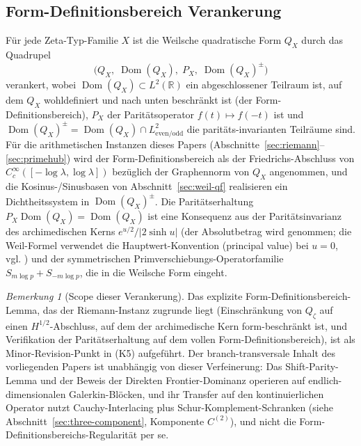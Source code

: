 \documentclass[11pt]{article}
\theoremstyle{definition}
\theoremstyle{remark}
\newtheorem{remark}[theorem]{Bemerkung}
\begin{document}
\subsection{Form-Definitionsbereich Verankerung}
\label{sec:weil-form-domain}

Für jede Zeta-Typ-Familie $X$ ist die Weilsche quadratische Form $Q_X$
durch das Quadrupel
\begin{equation}\label{eq:weil-quadruple}
  \bigl(Q_X,\; \operatorname{Dom}(Q_X),\; P_X,\;
        \operatorname{Dom}(Q_X)^{\pm}\bigr)
\end{equation}
verankert, wobei $\operatorname{Dom}(Q_X) \subset L^2(\mathbb{R})$ ein
abgeschlossener Teilraum ist, auf dem $Q_X$ wohldefiniert und nach unten beschränkt ist
(der Form-Definitionsbereich), $P_X$ der Paritätsoperator $f(t) \mapsto f(-t)$ ist und
$\operatorname{Dom}(Q_X)^{\pm} = \operatorname{Dom}(Q_X) \cap L^2_{\mathrm{even/odd}}$
die paritäts-invarianten Teilräume sind. Für die arithmetischen Instanzen
dieses Papers (Abschnitte~\ref{sec:riemann}--\ref{sec:primehub})
wird der Form-Definitionsbereich als der Friedrichs-Abschluss von
$C_c^{\infty}([-\log\lambda,\log\lambda])$ bezüglich der
Graphennorm von $Q_X$ angenommen, und die Kosinus-/Sinusbasen von
Abschnitt~\ref{sec:weil-qf} realisieren ein Dichtheitssystem in
$\operatorname{Dom}(Q_X)^{\pm}$. Die Paritätserhaltung
$P_X \operatorname{Dom}(Q_X) = \operatorname{Dom}(Q_X)$ ist eine
Konsequenz aus der Paritätsinvarianz des archimedischen Kerns
$e^{u/2}/|2\sinh u|$ (der Absolutbetrag wird genommen; die Weil-Formel verwendet
die Hauptwert-Konvention (principal value) bei $u = 0$, vgl. \cite{Weil1952})
und der symmetrischen Primverschiebungs-Operatorfamilie
$S_{m\log p} + S_{-m\log p}$, die in die Weilsche Form eingeht.

\begin{remark}[Scope dieser Verankerung]\label{rem:form-domain-scope}
Das explizite Form-Definitionsbereich-Lemma, das der Riemann-Instanz
zugrunde liegt (Einschränkung von $Q_\zeta$ auf einen $H^{1/2}$-Abschluss, auf dem der
archimedische Kern form-beschränkt ist, und Verifikation der Paritätserhaltung
auf dem vollen Form-Definitionsbereich), ist als Minor-Revision-Punkt
in \cite{RHCritiqueReview2026} (K5) aufgeführt. Der branch-transversale Inhalt
des vorliegenden Papers ist unabhängig von dieser Verfeinerung: Das Shift-Parity-Lemma
und der Beweis der Direkten Frontier-Dominanz operieren auf
endlich-dimensionalen Galerkin-Blöcken, und ihr Transfer auf den kontinuierlichen Operator
nutzt Cauchy-Interlacing plus Schur-Komplement-Schranken (siehe
Abschnitt~\ref{sec:three-component}, Komponente $C^{(2)}$), und nicht
die Form-Definitionsbereichs-Regularität per se.
\end{remark}
\end{document}
